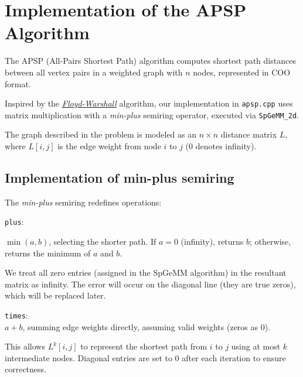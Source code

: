 \documentclass[11pt]{article}
\begin{document}
\newpage
\section{Implementation of the APSP Algorithm}

The APSP (All-Pairs Shortest Path) algorithm computes shortest path distances between all vertex pairs in a weighted graph with $n$ nodes, represented in COO format.  

Inspired by the \href{https://en.wikipedia.org/wiki/Floyd\%E2\%80\%93Warshall_algorithm}{\textit{Floyd-Warshall}} algorithm, our implementation in \texttt{apsp.cpp} uses matrix multiplication with a \textit{min-plus} semiring operator, executed via \texttt{SpGeMM\_2d}.  

The graph described in the problem is modeled as an $n \times n$ distance matrix $L$, where $L[i,j]$ is the edge weight from node $i$ to $j$ (0 denotes infinity). 

\subsection{Implementation of min-plus semiring}
The \textit{min-plus} semiring redefines operations:
\begin{itemize}[topsep=0pt, itemsep=0pt]
    \item \texttt{plus}:\\
          {\color{black}$\min(a, b)$, selecting the shorter path. If $a=0$ (infinity), returns $b$; otherwise, returns the minimum of $a$ and $b$.
    \item We treat all zero entries (assigned in the SpGeMM algorithm) in the resultant matrix as infinity. The error will occur on the diagonal line (they are true zeros), which will be replaced later.
          }
    \item \texttt{times}:\\
          {\color{black}$a + b$, summing edge weights directly, assuming valid weights (zeros as 0).}
\end{itemize}
{\color{black}This allows $L^k[i,j]$ to represent the shortest path from $i$ to $j$ using at most $k$ intermediate nodes. Diagonal entries are set to 0 after each iteration to ensure correctness.}

\end{document}
